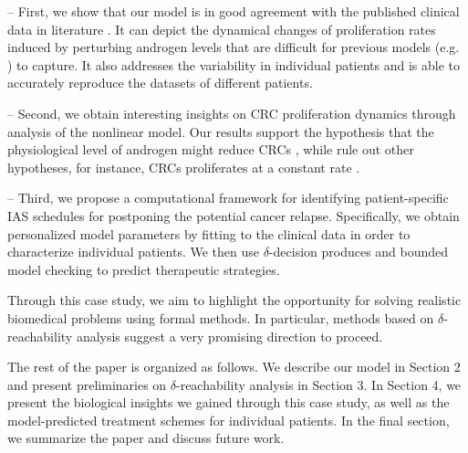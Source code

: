 -- First, we show that our model is in good agreement with the published clinical data in literature \cite{ bruchovsky06,bruchovsky07}. It can depict the dynamical changes of proliferation rates induced by perturbing androgen levels that are difficult for previous models (e.g. \cite{ideta08}) to capture. It also addresses the variability in individual patients and is able to accurately reproduce the datasets of different patients.  

-- Second, we obtain interesting insights on CRC proliferation dynamics through analysis of the nonlinear model. Our results support the hypothesis that the physiological level of androgen might reduce CRCs \cite{ideta08}, while rule out other hypotheses, for instance, CRCs proliferates at a constant rate \cite{portz12}. 

-- Third, we propose a computational framework for identifying patient-specific IAS schedules for postponing the potential cancer relapse. Specifically, we obtain personalized model parameters by fitting to the clinical data in order to characterize individual patients. We then use $\delta$-decision produces and bounded model checking to predict therapeutic strategies. 

Through this case study, we aim to highlight the opportunity for solving realistic biomedical problems using formal methods. In particular, methods based on $\delta$-reachability analysis suggest a very promising direction to proceed.  


The rest of the paper is organized as follows. We describe our model in Section 2 and present preliminaries on $\delta$-reachability analysis in Section 3. In Section 4, we present the biological insights we gained through this case study, as well as the model-predicted treatment schemes for individual patients. In the final section, we summarize the paper and discuss future work.
